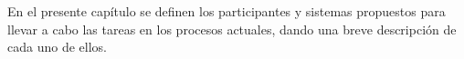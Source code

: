%

En el presente capítulo se definen los participantes y sistemas propuestos para 
llevar a cabo las tareas en los procesos actuales, dando una breve descripción 
de cada uno de ellos.
